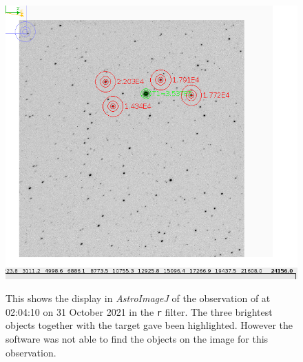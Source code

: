 \begin{figure}[!htbp]
\begin{center}
\includegraphics[scale=0.40]{images/AIJsnap.png} \\
\vspace{-.5cm}
\end{center}
\caption{This shows the display in \textit{AstroImageJ} of the observation of
{\ross} at 02:04:10 on 31 October 2021 in the \texttt{r} filter. The three
brightest objects together with the target gave been highlighted. However the
software was not able to find the objects on the image for this observation.}
\protect\label{fig:aijimage}
\end{figure}

